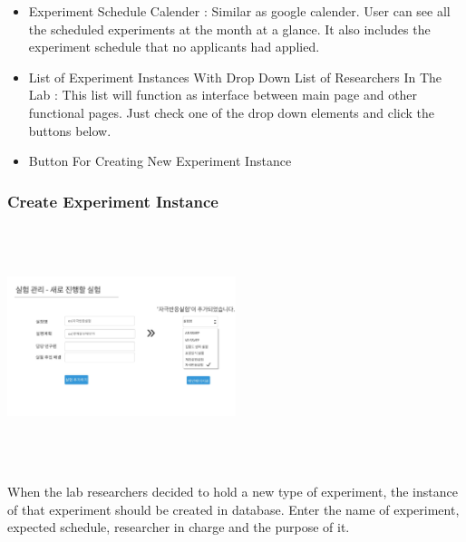 \documentclass[letterpaper, 10 pt, conference]{ieeeconf}  %
\begin{document}
\begin{itemize}
\item Experiment Schedule Calender : Similar as google calender. User can see all the scheduled experiments at the month at a glance. It also includes the experiment schedule that no applicants had applied. 
\item List of Experiment Instances With Drop Down List of Researchers In The Lab : This list will function as interface between main page and other functional pages. Just check one of the drop down elements and click the buttons below. 
\item Button For Creating New Experiment Instance
\end{itemize}

\subsubsection{Create Experiment Instance}

\includegraphics[width=0.5\textwidth,height = 7cm]{Oven/07_addNewExperiment.jpg}

When the lab researchers decided to hold a new type of experiment, the instance of that experiment should be created in database. Enter the name of experiment, expected schedule, researcher in charge and the purpose of it. \\
\end{document}
